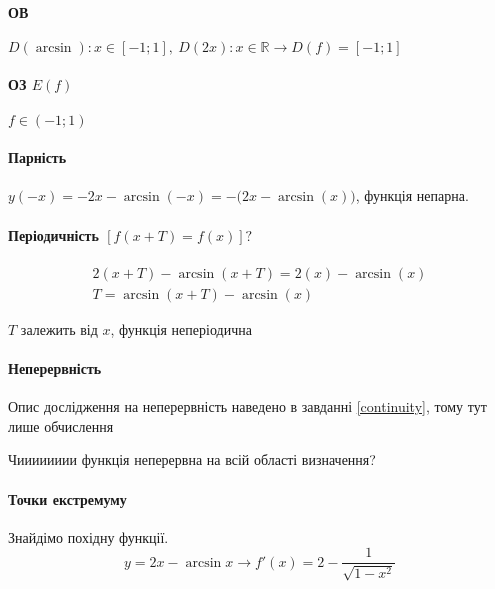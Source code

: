 \documentclass[../rgr1.tex]{subfiles}
\begin{document}

\Solution

\paragraph{ОВ} $D(\arcsin): x \in [-1;1],~D(2x): x \in \mathbb{R} \to D(f) = [-1;1]$
\paragraph{ОЗ $E(f)$} $f \in ( -1; 1 )$
\paragraph{Парність}
$
	y(-x) = -2x - \arcsin (-x)
	= - \big( 2x - \arcsin (x) \big)
$, функція непарна.

\paragraph{Періодичність $[f(x+T) = f(x)]?$}

\begin{align}
	2(x+T)-\arcsin(x+T) = 2(x)-\arcsin(x) \\
	T = \arcsin(x+T) - \arcsin(x)
\end{align}


$T$ залежить від $x$, функція неперіодична

\paragraph{Неперервність} Опис дослідження на неперервність наведено в завданні \ref{continuity}, тому тут лише обчислення

Чииииииии функція неперервна на всій області визначення?

\paragraph{Точки екстремуму}
Знайдімо похідну функції.
\begin{equation}
	y = 2x - \arcsin x \to
	f'(x) = 2 - \frac{1}{\sqrt{1-x^2}}
\end{equation}
\end{document}
